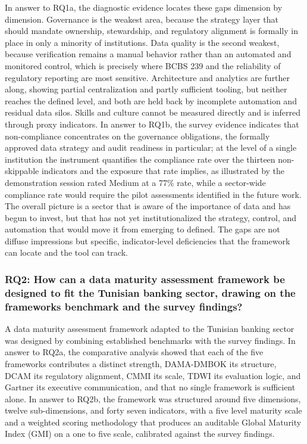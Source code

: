 In answer to RQ1a, the diagnostic evidence locates these gaps dimension by dimension. Governance is the weakest area, because the strategy layer that should mandate ownership, stewardship, and regulatory alignment is formally in place in only a minority of institutions. Data quality is the second weakest, because verification remains a manual behavior rather than an automated and monitored control, which is precisely where BCBS 239 and the reliability of regulatory reporting are most sensitive. Architecture and analytics are further along, showing partial centralization and partly sufficient tooling, but neither reaches the defined level, and both are held back by incomplete automation and residual data silos. Skills and culture cannot be measured directly and is inferred through proxy indicators. In answer to RQ1b, the survey evidence indicates that non-compliance concentrates on the governance obligations, the formally approved data strategy and audit readiness in particular; at the level of a single institution the instrument quantifies the compliance rate over the thirteen non-skippable indicators and the exposure that rate implies, as illustrated by the demonstration session rated Medium at a 77\% rate, while a sector-wide compliance rate would require the pilot assessments identified in the future work. The overall picture is a sector that is aware of the importance of data and has begun to invest, but that has not yet institutionalized the strategy, control, and automation that would move it from emerging to defined. The gaps are not diffuse impressions but specific, indicator-level deficiencies that the framework can locate and the tool can track.

\subsubsection{RQ2: How can a data maturity assessment framework be designed to fit the Tunisian banking sector, drawing on the frameworks benchmark and the survey findings?}

A data maturity assessment framework adapted to the Tunisian banking sector was designed by combining established benchmarks with the survey findings. In answer to RQ2a, the comparative analysis showed that each of the five frameworks contributes a distinct strength, DAMA-DMBOK its structure, DCAM its regulatory alignment, CMMI its scale, TDWI its evaluation logic, and Gartner its executive communication, and that no single framework is sufficient alone. In answer to RQ2b, the framework was structured around five dimensions, twelve sub-dimensions, and forty seven indicators, with a five level maturity scale and a weighted scoring methodology that produces an auditable Global Maturity Index (GMI) on a one to five scale, calibrated against the survey findings.

